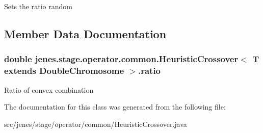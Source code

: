 Sets the ratio random 

\subsection{Member Data Documentation}
\hypertarget{classjenes_1_1stage_1_1operator_1_1common_1_1_heuristic_crossover_3_01_t_01extends_01_double_chromosome_01_4_9cae7cf20e3154743a4dbe53054f513b}{
\subsubsection[ratio]{\setlength{\rightskip}{0pt plus 5cm}double jenes.stage.operator.common.HeuristicCrossover$<$ T extends {\bf DoubleChromosome} $>$.{\bf ratio}}}
\label{classjenes_1_1stage_1_1operator_1_1common_1_1_heuristic_crossover_3_01_t_01extends_01_double_chromosome_01_4_9cae7cf20e3154743a4dbe53054f513b}


Ratio of convex combination 

The documentation for this class was generated from the following file:\begin{CompactItemize}
\item 
src/jenes/stage/operator/common/HeuristicCrossover.java\end{CompactItemize}

